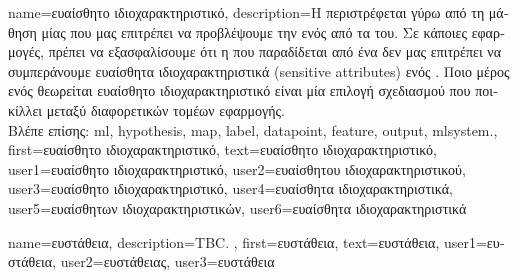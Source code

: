 {name={\foreignlanguage{greek}{ευαίσθητο ιδιοχαρακτηριστικό}},
	description={\foreignlanguage{greek}{Η}  
		\foreignlanguage{greek}{περιστρέφεται γύρω από τη μάθηση μίας}   
		\foreignlanguage{greek}{που μας επιτρέπει να προβλέψουμε την}  \foreignlanguage{greek}{ενός} 
		 \foreignlanguage{greek}{από τα}  \foreignlanguage{greek}{του}. 
		\foreignlanguage{greek}{Σε κάποιες εφαρμογές, πρέπει να εξασφαλίσουμε ότι η}  
		\foreignlanguage{greek}{που παραδίδεται από ένα}  \foreignlanguage{greek}{δεν μας επιτρέπει 
		να συμπεράνουμε ευαί\-σθητα ιδιοχαρακτηριστικά} (sensitive attributes) \foreignlanguage{greek}{ενός} . 
		\foreignlanguage{greek}{Ποιο μέρος ενός}  \foreignlanguage{greek}{θεωρείται ευαίσθητο ιδιοχαρακτηριστικό 
		είναι μία επιλογή σχεδιασμού που ποικίλλει μεταξύ διαφορετικών τομέων εφαρμογής.}
		\\
		\foreignlanguage{greek}{Βλέπε επίσης:} \gls{ml}, \gls{hypothesis}, \gls{map}, \gls{label}, \gls{datapoint}, \gls{feature}, \gls{output}, 
		\gls{mlsystem}.},
	first={\foreignlanguage{greek}{ευαίσθητο ιδιοχαρακτηριστικό}},
	text={\foreignlanguage{greek}{ευαίσθητο ιδιοχαρακτηριστικό}},
	user1={\foreignlanguage{greek}{ευαίσθητο ιδιοχαρακτηριστικό}}, %
    	user2={\foreignlanguage{greek}{ευαίσθητου ιδιοχαρακτηριστικού}}, %
	user3={\foreignlanguage{greek}{ευαίσθητο ιδιοχαρακτηριστικό}}, %
	user4={\foreignlanguage{greek}{ευαίσθητα ιδιοχαρακτηριστικά}}, %
    	user5={\foreignlanguage{greek}{ευαίσθητων ιδιοχαρακτηριστικών}}, %
	user6={\foreignlanguage{greek}{ευαί\-σθητα ιδιοχαρακτηριστικά}} %
}

{name={\foreignlanguage{greek}{ευστάθεια}},
	description={TBC. }, 
	first={\foreignlanguage{greek}{ευστάθεια}}, 
	text={\foreignlanguage{greek}{ευστάθεια}},
	user1={\foreignlanguage{greek}{ευστάθεια}}, %
  	user2={\foreignlanguage{greek}{ευστάθειας}}, %
	user3={\foreignlanguage{greek}{ευστάθεια}} %
}

